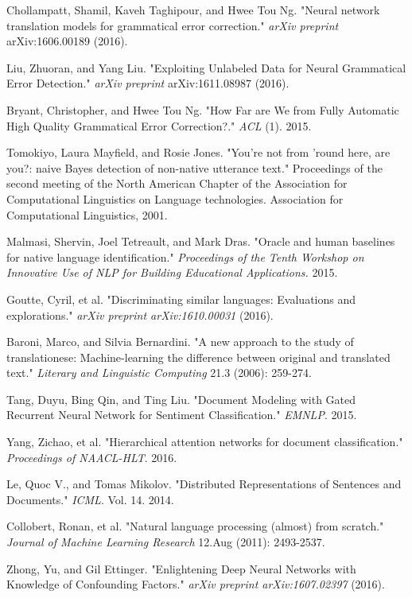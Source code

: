 \documentclass{article} %
\begin{document}
\begin{thebibliography}{6}

    Chollampatt, Shamil, Kaveh Taghipour, and Hwee Tou Ng.
    "Neural network translation models for grammatical error correction."
    \emph{arXiv preprint} arXiv:1606.00189 (2016).

    Liu, Zhuoran, and Yang Liu.
    "Exploiting Unlabeled Data for Neural Grammatical Error Detection."
    \emph{arXiv preprint} arXiv:1611.08987 (2016).

    Bryant, Christopher, and Hwee Tou Ng.
    "How Far are We from Fully Automatic High Quality Grammatical Error Correction?."
    \emph{ACL} (1). 2015.

    Tomokiyo, Laura Mayfield, and Rosie Jones.
    "You're not from 'round here, are you?: naive Bayes detection of non-native utterance text."
    {Proceedings of the second meeting of the North American Chapter of the Association
    for Computational Linguistics on Language technologies.} Association for Computational Linguistics, 2001.

    Malmasi, Shervin, Joel Tetreault, and Mark Dras.
    "Oracle and human baselines for native language identification."
    \emph{Proceedings of the Tenth Workshop on Innovative Use of NLP for Building
    Educational Applications.} 2015.

    Goutte, Cyril, et al.
    "Discriminating similar languages: Evaluations and explorations."
    \emph{arXiv preprint arXiv:1610.00031} (2016).

    Baroni, Marco, and Silvia Bernardini.
    "A new approach to the study of translationese: Machine-learning the difference
    between original and translated text."
    \emph{Literary and Linguistic Computing} 21.3 (2006): 259-274.

    Tang, Duyu, Bing Qin, and Ting Liu.
    "Document Modeling with Gated Recurrent Neural Network for Sentiment Classification."
    \emph{EMNLP}. 2015.

    Yang, Zichao, et al.
    "Hierarchical attention networks for document classification."
    \emph{Proceedings of NAACL-HLT}. 2016.

    Le, Quoc V., and Tomas Mikolov.
    "Distributed Representations of Sentences and Documents."
    \emph{ICML}. Vol. 14. 2014.

    Collobert, Ronan, et al.
    "Natural language processing (almost) from scratch."
    \emph{Journal of Machine Learning Research} 12.Aug (2011): 2493-2537.

    Zhong, Yu, and Gil Ettinger.
    "Enlightening Deep Neural Networks with Knowledge of Confounding Factors."
    \emph{arXiv preprint arXiv:1607.02397} (2016).
\end{thebibliography}
\end{document}
